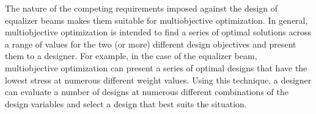 The nature of the competing requirements imposed against the design of equalizer beams makes them suitable for multiobjective optimization. In general, multiobjective optimization is intended to find a series of optimal solutions across a range of values for the two (or more) different design objectives and present them to a designer. For example, in the case of the equalizer beam, multiobjective optimization can present a series of optimal designs that have the lowest stress at numerous different weight values.  Using this technique, a designer can evaluate a number of designs at numerous different combinations of the design variables and select a design that best suits the situation. 


